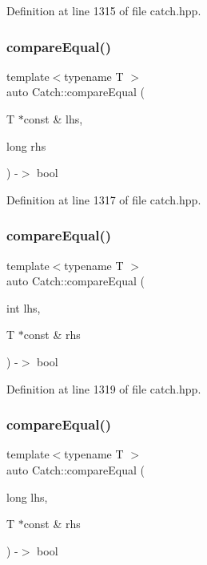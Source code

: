 Definition at line 1315 of file catch.\+hpp.

\mbox{\label{namespace_catch_afca4a005e1053c542462dc7a603b41b3}} 
\subsubsection{\texorpdfstring{compare\+Equal()}{compareEqual()}\hspace{0.1cm}{\footnotesize\ttfamily [3/5]}}
{\footnotesize\ttfamily template$<$typename T $>$ \\
auto Catch\+::compare\+Equal (\begin{DoxyParamCaption}\item[{T $\ast$const \&}]{lhs,  }\item[{long}]{rhs }\end{DoxyParamCaption}) -\/$>$ bool }



Definition at line 1317 of file catch.\+hpp.

\mbox{\label{namespace_catch_a6af99378569fc6f68270b6af669f1c3b}} 
\subsubsection{\texorpdfstring{compare\+Equal()}{compareEqual()}\hspace{0.1cm}{\footnotesize\ttfamily [4/5]}}
{\footnotesize\ttfamily template$<$typename T $>$ \\
auto Catch\+::compare\+Equal (\begin{DoxyParamCaption}\item[{int}]{lhs,  }\item[{T $\ast$const \&}]{rhs }\end{DoxyParamCaption}) -\/$>$ bool }



Definition at line 1319 of file catch.\+hpp.

\mbox{\label{namespace_catch_a72f10ec2cad6db16029d48c8c1d9df2f}} 
\subsubsection{\texorpdfstring{compare\+Equal()}{compareEqual()}\hspace{0.1cm}{\footnotesize\ttfamily [5/5]}}
{\footnotesize\ttfamily template$<$typename T $>$ \\
auto Catch\+::compare\+Equal (\begin{DoxyParamCaption}\item[{long}]{lhs,  }\item[{T $\ast$const \&}]{rhs }\end{DoxyParamCaption}) -\/$>$ bool }



